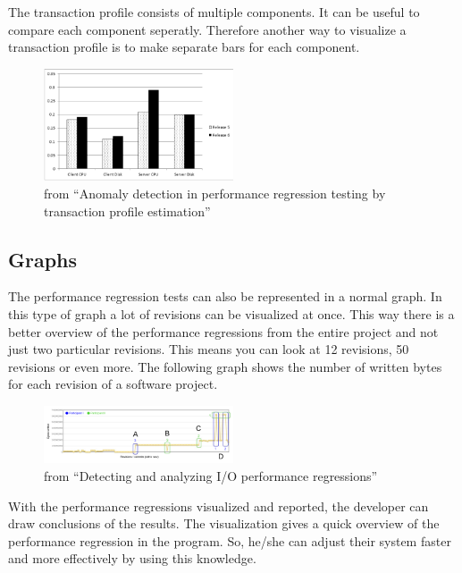 The transaction profile consists of multiple components. It can be useful to compare each component seperatly. Therefore another way to visualize a transaction profile is to make separate bars for each component.

\begin{figure}[h]
\begin{center}
  \includegraphics[width=0.5\textwidth]{Figures/TPbars.png}
\end{center}
  \caption{from ``Anomaly detection in performance regression testing by transaction profile estimation''\cite{ghaith2015anomaly}}

\end{figure}
\newpage
\subsection{Graphs}
The performance regression tests can also be represented in a normal graph. In this type of graph a lot of revisions can be visualized at once. This way there is a better overview of the performance regressions from the entire project and not just two particular revisions. This means you can look at 12 revisions, 50 revisions or even more. The following graph shows the number of written bytes for each revision of a software project.

\begin{figure}[h]
\begin{center}
  \includegraphics[width=0.5\textwidth]{Figures/bytegraph.png}
\end{center}
  \caption{from ``Detecting and analyzing I/O performance regressions''\cite{bezemer2014detecting}}

\end{figure}
With the performance regressions visualized and reported, the developer can draw conclusions of the results. The visualization gives a quick overview of the performance regression in the program. So, he/she can adjust their system faster and more effectively by using this knowledge.



